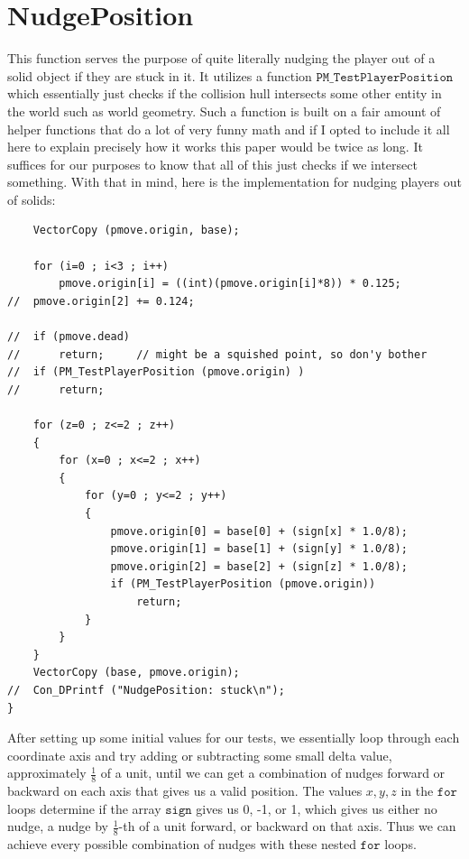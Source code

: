 \documentclass{article}
\begin{document}
\section{NudgePosition}
This function serves the purpose of quite literally nudging the player out of a solid object if they are stuck in it. It utilizes a function $\texttt{PM\_TestPlayerPosition}$ which essentially just checks if the collision hull intersects some other entity in the world such as world geometry. Such a function is built on a fair amount of helper functions that do a lot of very funny math and if I opted to include it all here to explain precisely how it works this paper would be twice as long. It suffices for our purposes to know that all of this just checks if we intersect something. With that in mind, here is the implementation for nudging players out of solids:
\begin{verbatim}
	VectorCopy (pmove.origin, base);

	for (i=0 ; i<3 ; i++)
		pmove.origin[i] = ((int)(pmove.origin[i]*8)) * 0.125;
//	pmove.origin[2] += 0.124;

//	if (pmove.dead)
//		return;		// might be a squished point, so don'y bother
//	if (PM_TestPlayerPosition (pmove.origin) )
//		return;

	for (z=0 ; z<=2 ; z++)
	{
		for (x=0 ; x<=2 ; x++)
		{
			for (y=0 ; y<=2 ; y++)
			{
				pmove.origin[0] = base[0] + (sign[x] * 1.0/8);
				pmove.origin[1] = base[1] + (sign[y] * 1.0/8);
				pmove.origin[2] = base[2] + (sign[z] * 1.0/8);
				if (PM_TestPlayerPosition (pmove.origin))
					return;
			}
		}
	}
	VectorCopy (base, pmove.origin);
//	Con_DPrintf ("NudgePosition: stuck\n");
}
\end{verbatim}
After setting up some initial values for our tests, we essentially loop through each coordinate axis and try adding or subtracting some small delta value, approximately $\frac{1}{8}$ of a unit, until we can get a combination of nudges forward or backward on each axis that gives us a valid position. The values $x,y,z$ in the $\texttt{for}$ loops determine if the array $\texttt{sign}$ gives us 0, -1, or 1, which gives us either no nudge, a nudge by $\frac{1}{8}$-th of a unit forward, or backward on that axis. Thus we can achieve every possible combination of nudges with these nested $\texttt{for}$ loops.
\end{document}
